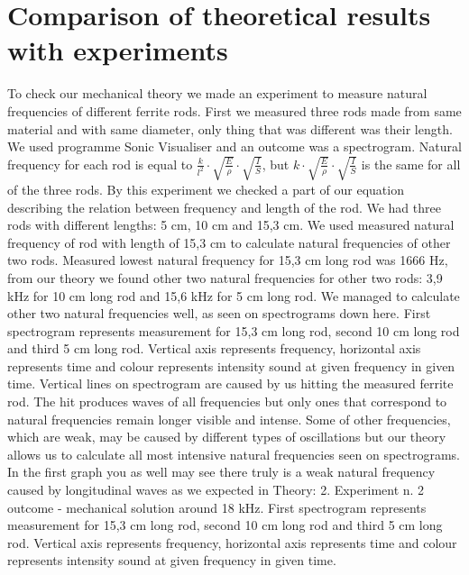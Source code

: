 \documentclass[10pt,a4paper]{article}
\begin{document}
\section{Comparison of theoretical results with experiments}
To check our mechanical theory we made an experiment to measure natural frequencies of different ferrite rods. First we measured three rods made from same material and with same diameter, only thing that was different was their length. We used programme Sonic Visualiser and an outcome was a spectrogram. 
Natural frequency for each rod is equal to $ \frac{k}{l^{2}} \cdot \sqrt{\frac{E}{\rho}} \cdot \sqrt{\frac{I}{S}}$, 
but $ k\cdot \sqrt{\frac{E}{\rho}} \cdot \sqrt{\frac{I}{S}}$ is the same for all of the three rods. By this experiment we checked a part of our equation describing the relation between frequency and length of the rod. We had three rods with different lengths: 5 cm, 10 cm and 15,3 cm. We used measured natural frequency of rod with length of 15,3 cm to calculate natural frequencies of other two rods. Measured lowest natural frequency for 15,3 cm long rod was 1666 Hz, from our theory we found other two natural frequencies for other two rods: 3,9 kHz for 10 cm long rod and 15,6 kHz for 5 cm long rod. We managed to calculate other two natural frequencies well, as seen on spectrograms down here. First spectrogram represents measurement for 15,3 cm long rod, second 10 cm long rod and third 5 cm long rod. Vertical axis represents frequency, horizontal axis represents time and colour represents intensity sound at given frequency in given time. Vertical lines on spectrogram are caused by us hitting the measured ferrite rod. The hit produces waves of all frequencies but only ones that correspond to natural frequencies remain longer visible and intense. Some of other frequencies, which are weak, may be caused by different types of oscillations but our theory allows us to calculate all most intensive natural frequencies seen on spectrograms. In the first graph you as well may see there truly is a weak natural frequency caused by longitudinal waves as we expected in Theory: 2. Experiment n. 2 outcome - mechanical solution around 18 kHz. First spectrogram represents measurement for 15,3 cm long rod, second 10 cm long rod and third 5 cm long rod. Vertical axis represents frequency, horizontal axis represents time and colour represents intensity sound at given frequency in given time.
\end{document}
